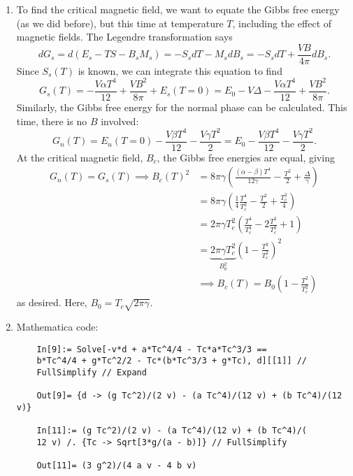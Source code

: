 \documentclass{article}
\theoremstyle{definition}
\newcommand{\al}{\alpha}
\newcommand{\be}{\beta}
\newcommand{\f}[2]{\frac{#1}{#2}}
\newcommand{\lp}{\left(}
\newcommand{\rp}{\right)}
\begin{document}
\begin{enumerate}[label=(\alph*)]
	
	
	
	\item To find the critical magnetic field, we want to equate the Gibbs free energy (as we did before), but this time at temperature $T$, including the effect of magnetic fields. The Legendre transformation says 
	\begin{equation*}
	dG_s = d(E_s-TS-B_sM_s) = -S_sdT - M_sdB_s = -S_sdT + \f{VB}{4\pi}dB_s.
	\end{equation*}
	Since $S_s(T)$ is known, we can integrate this equation to find 
	\begin{equation*}
	G_s(T) = -\f{V\al T^4}{12} + \f{VB^2}{8\pi} + E_s(T=0) = E_0 - V\Delta -\f{V\al T^4}{12} + \f{VB^2}{8\pi}.
	\end{equation*}
	Similarly, the Gibbs free energy for the normal phase can be calculated. This time, there is no $B$ involved:
	\begin{equation*}
	G_n(T) = E_n(T=0) - \f{V\be T^4}{12} - \f{V\gamma T^2}{2} = E_0 - \f{V\be T^4}{12} - \f{V\gamma T^2}{2}.
	\end{equation*}
	At the critical magnetic field, $B_c$, the Gibbs free energies are equal, giving 
	\begin{align*}
	G_n(T) = G_s(T) \implies 
	B_c(T)^2 &= 8\pi \gamma \lp \f{(\al-\be)T^4}{12\gamma} - \f{ T^2}{2} + \f{\Delta}{\gamma}  \rp\\
	&= 8\pi \gamma \lp \f{1}{4}\f{T^4}{T_c^2} - \f{T^2}{2} + \f{T_c^2}{4} \rp \\
	&= 2\pi \gamma T_c^2\lp \f{T^4}{T_c^4} - 2\f{T^2}{T_c^2}+ 1 \rp \\
	&= \underbrace{2\pi \gamma T_c^2}_{B_0^2} \lp 1 -  \f{T^2}{T_c^2} \rp^2 \\
	&\implies \boxed{B_c(T) = B_0 \lp 1 - \f{T^2}{T_c^2} \rp}
	\end{align*}
	as desired. Here, $B_0 = T_c \sqrt{2\pi \gamma}$.
	
	
	\item Mathematica code:
	\begin{lstlisting}
	In[9]:= Solve[-v*d + a*Tc^4/4 - Tc*a*Tc^3/3 == 
	b*Tc^4/4 + g*Tc^2/2 - Tc*(b*Tc^3/3 + g*Tc), d][[1]] // 
	FullSimplify // Expand
	
	Out[9]= {d -> (g Tc^2)/(2 v) - (a Tc^4)/(12 v) + (b Tc^4)/(12 v)}
	
	In[11]:= (g Tc^2)/(2 v) - (a Tc^4)/(12 v) + (b Tc^4)/(
	12 v) /. {Tc -> Sqrt[3*g/(a - b)]} // FullSimplify
	
	Out[11]= (3 g^2)/(4 a v - 4 b v)
	\end{lstlisting}
	

	
\end{enumerate}
\end{document}

